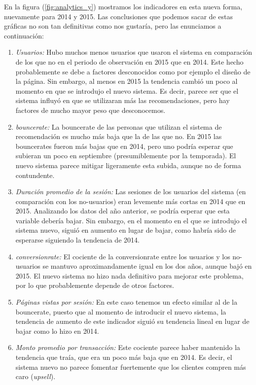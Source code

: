 \documentclass[12pt]{report}
\begin{document}
En la figura (\ref{fig:analytics_y}) mostramos los indicadores en esta nueva forma, nuevamente para 2014 y 2015. Las conclusiones que podemos sacar de estas gráficas no son tan definitivas como nos gustaría, pero las enunciamos a continuación:
\begin{enumerate}
	\item \emph{Usuarios:} Hubo muchos menos usuarios que usaron el sistema en comparación de los que no en el periodo de observación en 2015 que en 2014. Este hecho probablemente se debe a factores desconocidos como por ejemplo el diseño de la página. Sin embargo, al menos en 2015 la tendencia cambió un poco al momento en que se introdujo el nuevo sistema. Es decir, parece ser que el sistema influyó en que se utilizaran más las recomendaciones, pero hay factores de mucho mayor peso que desconocemos.
	\item \emph{\Gls{bouncerate}:} La \gls{bouncerate} de las personas que utilizan el sistema de recomendación es mucho más baja que la de las que no. En 2015 las \glspl{bouncerate} fueron más bajas que en 2014, pero uno podría esperar que subieran un poco en septiembre (presumiblemente por la temporada). El nuevo sistema parece mitigar ligeramente esta subida, aunque no de forma contundente.
	\item \emph{Duración promedio de la sesión:} Las sesiones de los usuarios del sistema (en comparación con los no-usuarios) eran levemente más cortas en 2014 que en 2015. Analizando los datos del año anterior, se podría esperar que esta variable debería bajar. Sin embargo, en el momento en el que se introdujo el sistema nuevo, siguió en aumento en lugar de bajar, como habría sido de esperarse siguiendo la tendencia de 2014.
	\item \emph{\Gls{conversionrate}:} El cociente de la \gls{conversionrate} entre los usuarios y los no-usuarios se mantuvo aproximandamente igual en los dos años, aunque bajó en 2015. El nuevo sistema no hizo nada definitivo para mejorar este problema, por lo que probablemente depende de otros factores.
	\item \emph{Páginas vistas por sesión:} En este caso tenemos un efecto similar al de la \gls{bouncerate}, puesto que al momento de introducir el nuevo sistema, la tendencia de aumento de este indicador siguió su tendencia lineal en lugar de bajar como lo hizo en 2014.
	\item \emph{Monto promedio por transacción:} Este cociente parece haber mantenido la tendencia que traía, que era un poco más baja que en 2014. Es decir, el sistema nuevo no parece fomentar fuertemente que los clientes compren más caro (\emph{upsell}).
\end{enumerate}
\end{document}

